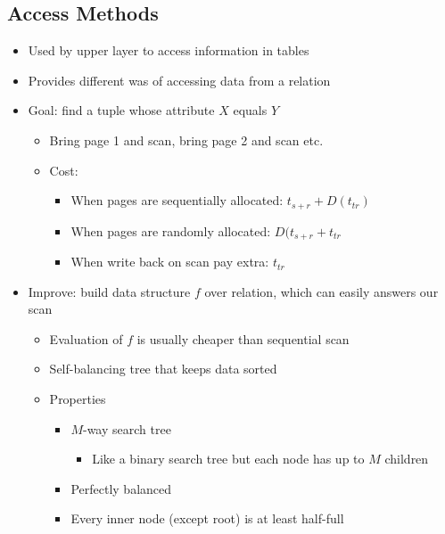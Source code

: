 \subsection{Access Methods}
\begin{itemize}
    \item Used by upper layer to access information in tables
    \item Provides different was of accessing data from a relation
    \item Goal: find a tuple whose attribute $X$ equals $Y$
        \begin{itemize}
            \item Bring page 1 and scan, bring page 2 and scan etc.
            \item Cost:
                \begin{itemize}
                    \item When pages are sequentially allocated: $t_{s+r} + D(t_{tr})$
                    \item When pages are randomly allocated: $D(t_{s+r} + t_{tr}$
                    \item When write back on scan pay extra: $t_{tr}$
                \end{itemize}
        \end{itemize}
    \item Improve: build data structure $f$ over relation, which can easily answers our scan
        \begin{itemize}
            \item Evaluation of $f$ is usually cheaper than sequential scan
        \end{itemize}
        \begin{itemize}
            \item Self-balancing tree that keeps data sorted
            \item Properties
                \begin{itemize}
                    \item $M$-way search tree
                        \begin{itemize}
                            \item Like a binary search tree but each node has up to $M$ children
                        \end{itemize}
                    \item Perfectly balanced
                    \item Every inner node (except root) is at least half-full

\end{itemize}
\end{itemize}
\end{itemize}
